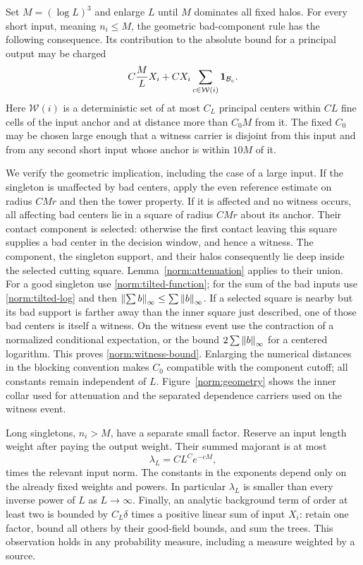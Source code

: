 Set $M=(\log L)^3$ and enlarge $L$ until $M$ dominates all fixed halos.
For every short input, meaning $n_i\le M$, the geometric bad-component
rule has the following consequence.  Its contribution to the absolute
bound for a principal output may be charged
\begin{equation}\label{norm:witness-bound}
       C\frac ML X_i
       +C X_i\sum_{c\in\mathcal W(i)}\mathbf 1_{\mathcal B_c}.
\end{equation}
Here $\mathcal W(i)$ is a deterministic set of at most $C_L$ principal
centers within $CL$ fine cells of the input anchor and at distance more
than $C_0M$ from it.  The fixed $C_0$ may be chosen large enough that a
witness carrier is disjoint from this input and from any second short
input whose anchor is within $10M$ of it.

We verify the geometric implication, including the case of a large
input.  If the singleton is unaffected by bad centers, apply the even
reference estimate on radius $CMr$ and then the tower property.  If it
is affected and no witness occurs, all affecting bad centers lie in a
square of radius $CMr$ about its anchor.  Their contact component is
selected: otherwise the first contact leaving this square supplies a
bad center in the decision window, and hence a witness.  The component,
the singleton support, and their halos consequently lie deep inside the
selected cutting square.  Lemma~\ref{norm:attenuation} applies to their
union.  For a good singleton use \eqref{norm:tilted-function}; for the
sum of the bad inputs use \eqref{norm:tilted-log} and then
$\left\lVert\sum b\right\rVert_\infty\le\sum\left\lVert b\right\rVert_\infty$.  If a selected square is
nearby but its bad support is farther away than the inner square just
described, one of those bad centers is itself a witness.  On the witness
event use the contraction of a normalized conditional expectation, or
the bound $2\sum\left\lVert b\right\rVert_\infty$ for a centered logarithm.  This proves
\eqref{norm:witness-bound}.  Enlarging the numerical distances in the
blocking convention makes $C_0$ compatible with the component cutoff;
all constants remain independent of $L$.
Figure~\ref{norm:geometry} shows the inner collar used for attenuation
and the separated dependence carriers used on the witness event.


Long singletons, $n_i>M$, have a separate small factor.  Reserve an
input length weight after paying the output weight.  Their summed
majorant is at most
\begin{equation}\label{norm:long}
           \lambda_L=C L^C e^{-cM},
\end{equation}
times the relevant input norm.  The constants in the exponents depend
only on the already fixed weights and powers.  In particular $\lambda_L$
is smaller than every inverse power of $L$ as $L\to\infty$.
Finally, an analytic background term of order at least two is bounded
by $C_L\delta$ times a positive linear sum of input $X_i$: retain one
factor, bound all others by their good-field bounds, and sum the trees.
This observation holds in any probability measure, including a measure
weighted by a source.

